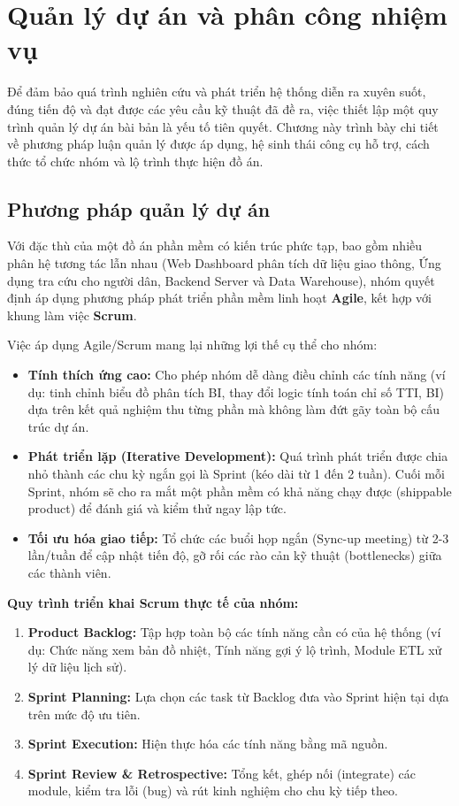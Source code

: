 \section{Quản lý dự án và phân công nhiệm vụ}

Để đảm bảo quá trình nghiên cứu và phát triển hệ thống diễn ra xuyên suốt, đúng tiến độ và đạt được các yêu cầu kỹ thuật đã đề ra, việc thiết lập một quy trình quản lý dự án bài bản là yếu tố tiên quyết. Chương này trình bày chi tiết về phương pháp luận quản lý được áp dụng, hệ sinh thái công cụ hỗ trợ, cách thức tổ chức nhóm và lộ trình thực hiện đồ án.

\subsection{Phương pháp quản lý dự án}

Với đặc thù của một đồ án phần mềm có kiến trúc phức tạp, bao gồm nhiều phân hệ tương tác lẫn nhau (Web Dashboard phân tích dữ liệu giao thông, Ứng dụng tra cứu cho người dân, Backend Server và Data Warehouse), nhóm quyết định áp dụng phương pháp phát triển phần mềm linh hoạt \textbf{Agile}, kết hợp với khung làm việc \textbf{Scrum}.

Việc áp dụng Agile/Scrum mang lại những lợi thế cụ thể cho nhóm:

\begin{itemize}
    \item \textbf{Tính thích ứng cao:} Cho phép nhóm dễ dàng điều chỉnh các tính năng (ví dụ: tinh chỉnh biểu đồ phân tích BI, thay đổi logic tính toán chỉ số TTI, BI) dựa trên kết quả nghiệm thu từng phần mà không làm đứt gãy toàn bộ cấu trúc dự án.
    \item \textbf{Phát triển lặp (Iterative Development):} Quá trình phát triển được chia nhỏ thành các chu kỳ ngắn gọi là Sprint (kéo dài từ 1 đến 2 tuần). Cuối mỗi Sprint, nhóm sẽ cho ra mắt một phần mềm có khả năng chạy được (shippable product) để đánh giá và kiểm thử ngay lập tức.
    \item \textbf{Tối ưu hóa giao tiếp:} Tổ chức các buổi họp ngắn (Sync-up meeting) từ 2-3 lần/tuần để cập nhật tiến độ, gỡ rối các rào cản kỹ thuật (bottlenecks) giữa các thành viên.
\end{itemize}

\textbf{Quy trình triển khai Scrum thực tế của nhóm:}
\begin{enumerate}
    \item \textbf{Product Backlog:} Tập hợp toàn bộ các tính năng cần có của hệ thống (ví dụ: Chức năng xem bản đồ nhiệt, Tính năng gợi ý lộ trình, Module ETL xử lý dữ liệu lịch sử).
    \item \textbf{Sprint Planning:} Lựa chọn các task từ Backlog đưa vào Sprint hiện tại dựa trên mức độ ưu tiên.
    \item \textbf{Sprint Execution:} Hiện thực hóa các tính năng bằng mã nguồn.
    \item \textbf{Sprint Review \& Retrospective:} Tổng kết, ghép nối (integrate) các module, kiểm tra lỗi (bug) và rút kinh nghiệm cho chu kỳ tiếp theo.
\end{enumerate}


